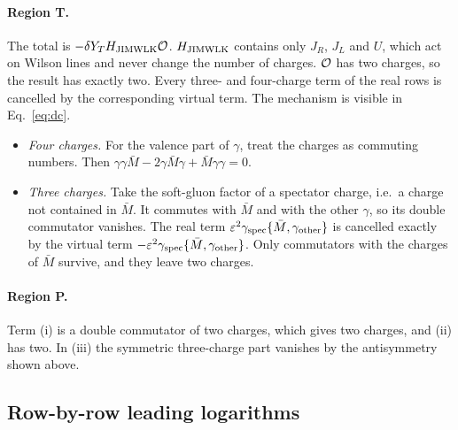 \paragraph*{Region T.} The total is $-\delta Y_TH_{\rm JIMWLK}\mathcal{O}$. $H_{\rm JIMWLK}$ contains only $J_R$, $J_L$ and $U$, which act on Wilson lines and never change the number of charges. $\mathcal{O}$ has two charges, so the result has exactly two. Every three- and four-charge term of the real rows is cancelled by the corresponding virtual term. The mechanism is visible in Eq.~\eqref{eq:dc}.
\begin{itemize}
\item \emph{Four charges.} For the valence part of $\gamma$, treat the charges as commuting numbers. Then $\gamma\gamma\bar M-2\gamma\bar M\gamma+\bar M\gamma\gamma=0$.
\item \emph{Three charges.} Take the soft-gluon factor of a spectator charge, i.e.\ a charge not contained in $\bar M$. It commutes with $\bar M$ and with the other $\gamma$, so its double commutator vanishes. The real term $\varepsilon^2\gamma_{\rm spec}\{\bar M,\gamma_{\rm other}\}$ is cancelled exactly by the virtual term $-\varepsilon^2\gamma_{\rm spec}\{\bar M,\gamma_{\rm other}\}$. Only commutators with the charges of $\bar M$ survive, and they leave two charges.
\end{itemize}
\paragraph*{Region P.} Term (i) is a double commutator of two charges, which gives two charges, and (ii) has two. In (iii) the symmetric three-charge part vanishes by the antisymmetry shown above.

\subsection{Row-by-row leading logarithms}\label{sec:LLrows}

